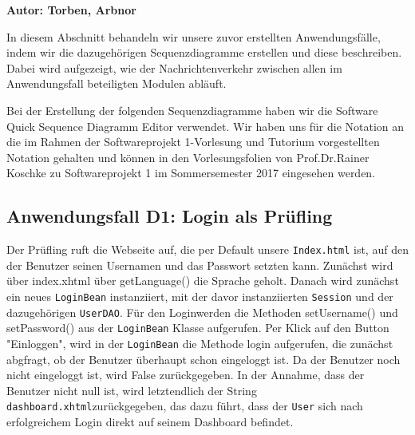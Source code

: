 \label{sec:anwendungsfaelle}

\textbf{Autor: Torben, Arbnor} 

In diesem Abschnitt behandeln wir unsere zuvor erstellten Anwendungsfälle, indem wir die dazugehörigen Sequenzdiagramme erstellen und diese beschreiben. Dabei wird aufgezeigt, wie der Nachrichtenverkehr zwischen allen im Anwendungsfall beteiligten Modulen abläuft.

Bei der Erstellung der folgenden Sequenzdiagramme haben wir die Software Quick Sequence Diagramm Editor verwendet. Wir haben uns für die Notation an die im Rahmen der Softwareprojekt 1-Vorlesung und Tutorium vorgestellten Notation gehalten und können in den Vorlesungsfolien von Prof.Dr.Rainer Koschke zu Softwareprojekt 1 im Sommersemester 2017 eingesehen werden.

\subsection{Anwendungsfall D1: Login als Prüfling}
Der Prüfling ruft die Webseite auf, die per Default unsere  \texttt {Index.html} ist, auf den der Benutzer seinen Usernamen und das Passwort setzten kann. Zunächst wird über index.xhtml über getLanguage() die Sprache geholt. Danach wird zunächst ein neues  \texttt {LoginBean} instanziiert, mit der davor instanziierten  \texttt {Session} und der dazugehörigen  \texttt {UserDAO}. Für den Loginwerden die Methoden setUsername() und setPassword() aus der  \texttt {LoginBean} Klasse aufgerufen. Per Klick auf den Button "Einloggen", wird in der  \texttt {LoginBean} die Methode login aufgerufen, die zunächst abgfragt, ob der Benutzer überhaupt schon eingeloggt ist. Da der Benutzer noch nicht eingeloggt ist, wird False zurückgegeben. In der Annahme, dass der Benutzer nicht null ist, wird letztendlich der String  \texttt {dashboard.xhtml}zurückgegeben, das dazu führt, dass der  \texttt {User} sich nach erfolgreichem Login direkt auf seinem Dashboard befindet.

